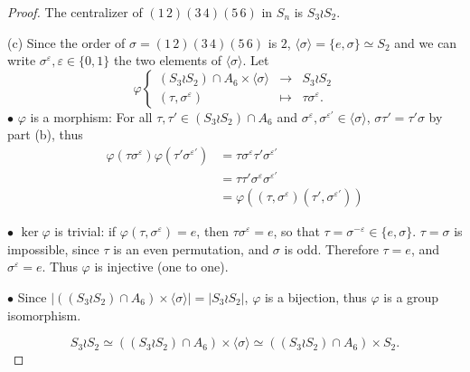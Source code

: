 \documentclass[11pt,a4paper]{article}
\begin{document}
\begin{proof}
The centralizer of $(1\,2)(3\,4)(5\,6)$ in $S_n$ is $S_3 \wr S_2$.

\item[(c)] Since the order of $\sigma = (1\,2)(3\,4)(5\,6)$ is $2$, $\langle \sigma \rangle = \{e,\sigma\} \simeq S_2$ and we can write $\sigma^{\varepsilon }, \varepsilon \in \{0,1\}$ the two elements of $\langle \sigma \rangle$.
Let
$$
\varphi
\left \{
\begin{array}{ccc}
(S_3 \wr S_2) \cap A_6 \times \langle \sigma \rangle & \to & S_3\wr S_2\\
(\tau, \sigma^{\varepsilon}) & \mapsto &\tau \sigma^{\varepsilon}.
\end{array}
\right.
$$
$\bullet$ $\varphi$ is a morphism: For all $\tau, \tau' \in (S_3 \wr S_2) \cap A_6$ and $\sigma^{\varepsilon}, \sigma^{\varepsilon'} \in \langle \sigma \rangle $, $\sigma \tau' = \tau' \sigma$ by part (b), thus
\begin{align*}
\varphi(\tau \sigma^{\varepsilon}) \varphi(\tau' \sigma^{\varepsilon'})&= \tau \sigma^{\varepsilon} \tau' \sigma^{\varepsilon'}\\
&= \tau \tau' \sigma^\varepsilon \sigma^{\varepsilon'}\\
&= \varphi((\tau,\sigma^\varepsilon) (\tau', \sigma^{\varepsilon'}))
\end{align*}

$\bullet$ $\ker \varphi$ is trivial: if $\varphi(\tau, \sigma^{\varepsilon}) = e$, then $\tau \sigma^{\varepsilon} = e$, so that $\tau  = \sigma^{-\varepsilon} \in \{e, \sigma\}$. $\tau = \sigma$ is impossible, since $\tau$ is an even permutation, and $\sigma$ is odd. Therefore $\tau = e$, and $\sigma^{\varepsilon} = e$. Thus $\varphi$ is injective (one to one).

$\bullet$ Since $|((S_3 \wr S_2) \cap A_6) \times \langle \sigma \rangle | = |S_3\wr S_2|$, $\varphi$ is a bijection, thus $\varphi$ is a group isomorphism.

$$S_3 \wr S_2 \simeq ((S_3 \wr S_2) \cap A_6) \times \langle \sigma \rangle  \simeq  ((S_3 \wr S_2) \cap A_6) \times S_2 .$$
\end{proof}
\end{document}
